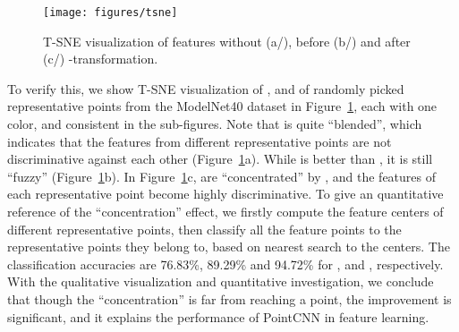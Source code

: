 \documentclass{article}
\begin{document}
\begin{figure}[t!]
	\begin{center}
		\texttt{[image: figures/tsne]}
	\end{center}
	\caption{T-SNE visualization of features without (a/), before (b/) and after (c/) -transformation.}
	\label{fig:tsne}
\end{figure}

To verify this, we show T-SNE visualization of ,  and  of  randomly picked representative points from the ModelNet40 dataset in Figure~\ref{fig:tsne}, each with one color, and consistent in the sub-figures. Note that  is quite ``blended'', which indicates that the features from different representative points are not discriminative against each other (Figure~\ref{fig:tsne}a). While  is better than , it is still ``fuzzy'' (Figure~\ref{fig:tsne}b). In Figure~\ref{fig:tsne}c,  are ``concentrated'' by , and the features of each representative point become highly discriminative. To give an quantitative reference of the ``concentration'' effect, we firstly compute the feature centers of different representative points, then classify all the feature points to the representative points they belong to, based on nearest search to the centers. The classification accuracies are 76.83\%, 89.29\% and 94.72\% for ,  and , respectively. With the qualitative visualization and quantitative investigation, we conclude that though the ``concentration'' is far from reaching a point, the improvement is significant, and it explains the performance of PointCNN in feature learning.

\begin{table}[h!]
  \centering
  \caption{Parameter number, FLOPs and running time comparisons.}
  \label{tab:statistics}
\end{table}
\end{document}
